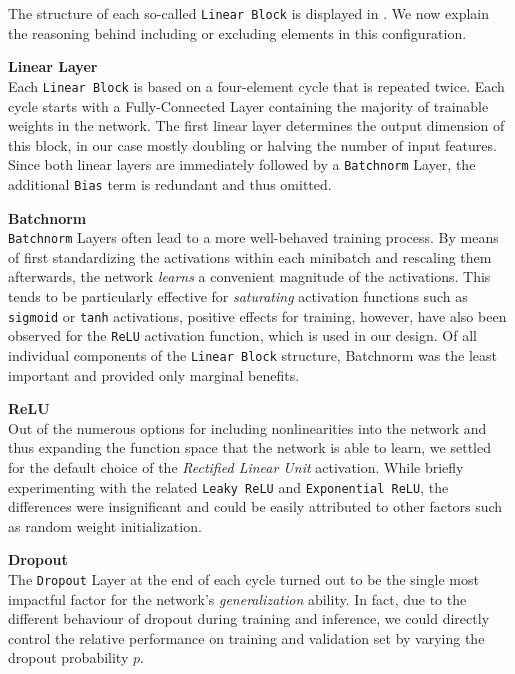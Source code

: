 The structure of each so-called \texttt{Linear Block} is displayed in .
We now explain the reasoning behind including or excluding elements in this configuration.

\textbf{Linear Layer} \\
Each \texttt{Linear Block} is based on a four-element cycle that is repeated twice.
Each cycle starts with a Fully-Connected Layer containing the majority of trainable weights in the network.
The first linear layer determines the output dimension of this block, in our case mostly doubling or halving the number of input features.
Since both linear layers are immediately followed by a \texttt{Batchnorm} Layer, the additional \texttt{Bias} term is redundant and thus omitted.

\textbf{Batchnorm} \\
\texttt{Batchnorm} Layers \citep{ioffe2015} often lead to a more well-behaved training process.
By means of first standardizing the activations within each minibatch and rescaling them afterwards, the network \emph{learns} a convenient magnitude of the activations.
This tends to be particularly effective for \emph{saturating} activation functions such as \texttt{sigmoid} or \texttt{tanh} activations, positive effects for training, however, have also been observed for the \texttt{ReLU} activation function, which is used in our design.
Of all individual components of the \texttt{Linear Block} structure, Batchnorm was the least important and provided only marginal benefits.

\textbf{ReLU} \\
Out of the numerous options for including nonlinearities into the network and thus expanding the function space that the network is able to learn, we settled for the default choice of the \emph{Rectified Linear Unit} activation.
While briefly experimenting with the related \texttt{Leaky ReLU} and \texttt{Exponential ReLU}, the differences were insignificant and could be easily attributed to other factors such as random weight initialization.

\textbf{Dropout} \label{dropout} \\
The \texttt{Dropout} Layer \citep{srivastava2014} at the end of each cycle turned out to be the single most impactful factor for the network's \emph{generalization} ability.
In fact, due to the different behaviour of dropout during training and inference, we could directly control the relative performance on training and validation set by varying the dropout probability $p$.

